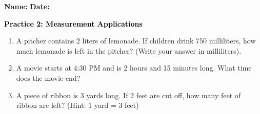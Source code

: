 \documentclass[12pt, letterpaper, fleqn]{article}
\begin{document}
\textbf{Name:} \underline{\hspace{5cm}}
\hfill
\textbf{Date:} \underline{\hspace{3cm}}\\

\begin{tcolorbox}[colback=customteal!20]
    \large\textcolor{black}{\textbf{Practice 2: Measurement Applications}}
\end{tcolorbox}
\begin{enumerate}[itemsep=3.5cm, leftmargin=0.6cm]
\item A pitcher contains 2 liters of lemonade. If children drink 750 milliliters, how much lemonade is left in the pitcher? (Write your answer in milliliters).
\vspace{3.5cm}
\item A movie starts at 4:30 PM and is 2 hours and 15 minutes long. What time does the movie end?
\vspace{3.5cm}
\item A piece of ribbon is 3 yards long. If 2 feet are cut off, how many feet of ribbon are left? (Hint: 1 yard = 3 feet)
\end{enumerate}
\end{document}
